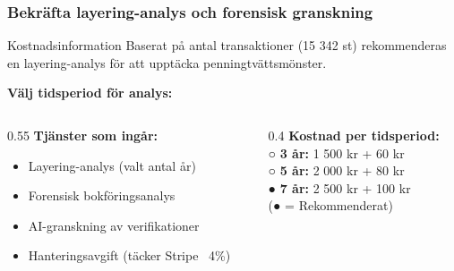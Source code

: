 \documentclass[10pt]{beamer}
\begin{document}

\begin{frame}[label=popup-layering-kostnad]
  \frametitle{Bekräfta layering-analys och forensisk granskning}
  
  \vspace{0.3cm}
  
  \begin{alertblock}{Kostnadsinformation}
    Baserat på antal transaktioner (15 342 st) rekommenderas en layering-analys för att upptäcka penningtvättsmönster.
  \end{alertblock}
  
  \vspace{0.5cm}
  
  \textbf{Välj tidsperiod för analys:}
  
  \vspace{0.3cm}
  
  \begin{columns}[T]
    \begin{column}{0.55\textwidth}
      \textbf{Tjänster som ingår:}
      \begin{itemize}
        \item Layering-analys (valt antal år)
        \item Forensisk bokföringsanalys
        \item AI-granskning av verifikationer
        \item Hanteringsavgift (täcker Stripe ~4\%)
      \end{itemize}
    \end{column}
    \begin{column}{0.4\textwidth}
      \textbf{Kostnad per tidsperiod:}\\
      \vspace{0.2cm}
      ○ \textbf{3 år:} 1 500 kr + 60 kr\\
      ○ \textbf{5 år:} 2 000 kr + 80 kr\\
      ● \textbf{7 år:} 2 500 kr + 100 kr\\
      \vspace{0.2cm}
      \tiny (● = Rekommenderat)
    \end{column}
  \end{columns}
  

\end{frame}
\end{document}
